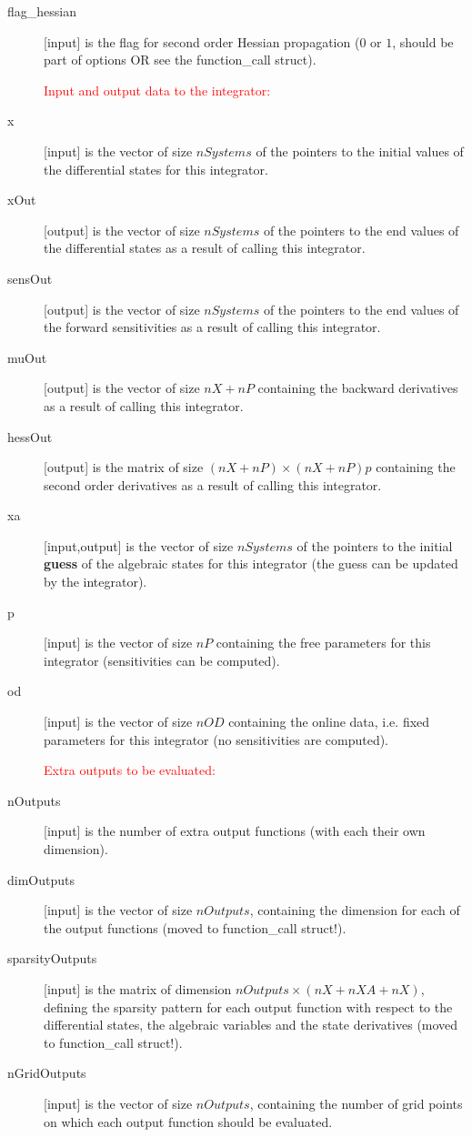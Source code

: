 \documentclass{report}
\begin{document}
\begin{description}
\item[flag\_hessian] [input] is the flag for second order Hessian propagation ($0$ or $1$, should be part of options OR see the function\_call struct).
\item[] \textcolor{red}{Input and output data to the integrator:}
\item[x] [input] is the vector of size $nSystems$ of the pointers to the initial values of the differential states for this integrator.
\item[xOut] [output] is the vector of size $nSystems$ of the pointers to the end values of the differential states as a result of calling this integrator.
\item[sensOut] [output] is the vector of size $nSystems$ of the pointers to the end values of the forward sensitivities as a result of calling this integrator.
\item[muOut] [output] is the vector of size $nX+nP$ containing the backward derivatives as a result of calling this integrator.
\item[hessOut] [output] is the matrix of size $(nX+nP) \times (nX+nP)p$ containing the second order derivatives as a result of calling this integrator.
\item[xa] [input,output] is the vector of size $nSystems$ of the pointers to the initial {\bf guess} of the algebraic states for this integrator (the guess can be updated by the integrator).
\item[p] [input] is the vector of size $nP$ containing the free parameters for this integrator (sensitivities can be computed).
\item[od] [input] is the vector of size $nOD$ containing the online data, i.e. fixed parameters for this integrator (no sensitivities are computed).
\item[] \textcolor{red}{Extra outputs to be evaluated:}
\item[nOutputs] [input] is the number of extra output functions (with each their own dimension).
\item[dimOutputs] [input] is the vector of size $nOutputs$, containing the dimension for each of the output functions (moved to function\_call struct!).
\item[sparsityOutputs] [input] is the matrix of dimension $nOutputs \times (nX+nXA+nX)$, defining the sparsity pattern for each output function with respect to the differential states, the algebraic variables and the state derivatives (moved to function\_call struct!).
\item[nGridOutputs] [input] is the vector of size $nOutputs$, containing the number of grid points on which each output function should be evaluated.

\end{description}
\end{document}
